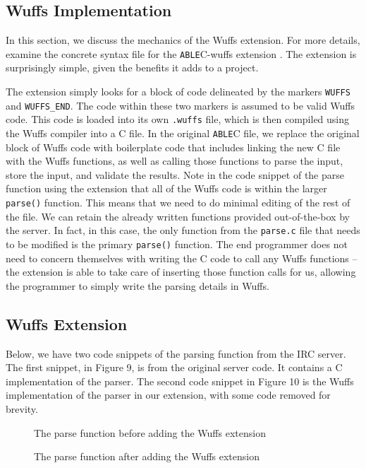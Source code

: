 \documentclass[main.tex]{subfiles}
\begin{document}
\subsection{Wuffs Implementation}
In this section, we discuss the mechanics of the Wuffs extension. For more details, examine the concrete syntax file
for the \verb|ABLE|C-wuffs extension \cite{11}. The extension is surprisingly simple, given the benefits it adds to a project.

The extension simply looks for a block of code delineated by the markers \verb|WUFFS| and \verb|WUFFS_END|. The
code within these two markers is assumed to be valid Wuffs code. This code is loaded into its own \verb|.wuffs| file,
which is then compiled using the Wuffs compiler into a C file. In the original \verb|ABLE|C file, we replace the original
block of Wuffs code with boilerplate code that includes linking the new C file with the Wuffs functions, as well as calling
those functions to parse the input, store the input, and validate the results. Note in the code snippet of the parse 
function using the extension that all of the Wuffs code is within the larger \verb|parse()| function. This means that we
need to do minimal editing of the rest of the file. We can retain the already written functions provided out-of-the-box by
the server. In fact, in this case, the only function from the \verb|parse.c| file that needs to be modified is the primary
\verb|parse()| function. The end programmer does not need to concern themselves with writing the C code to call any
Wuffs functions -- the extension is able to take care of inserting those function calls for us, allowing the programmer to
simply write the parsing details in Wuffs.

\subsection{Wuffs Extension}
Below, we have two code snippets of the parsing function from the IRC server. The first snippet, in Figure 9, is from the original 
server code. It contains a C implementation of the parser. The second code snippet in Figure 10 is the Wuffs implementation 
of the parser in our extension, with some code removed for brevity. 
\begin{figure}[hp]
	
	\caption{The parse function before adding the Wuffs extension}
\end{figure}
\begin{figure}[hp]
	
	\caption{The parse function after adding the Wuffs extension}
\end{figure}
\end{document}
